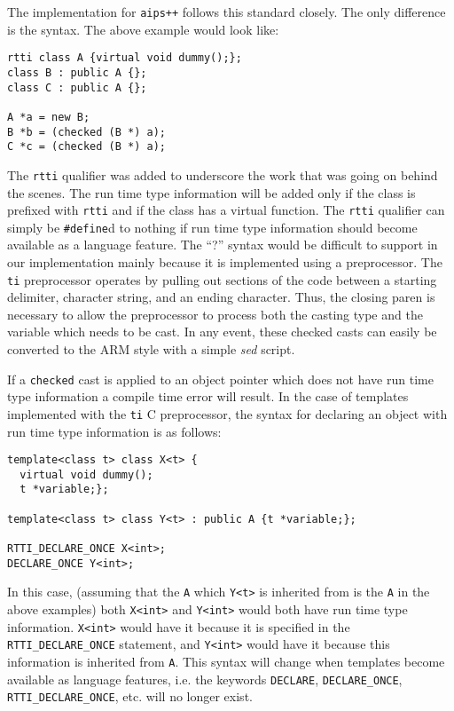 The implementation for {\tt aips++} follows this standard closely. The only
difference is the syntax. The above example would look like:
\begin{verbatim}
rtti class A {virtual void dummy();};
class B : public A {};
class C : public A {};

A *a = new B;
B *b = (checked (B *) a);
C *c = (checked (B *) a);
\end{verbatim}
\noindent
The {\tt rtti} qualifier was added to underscore the work that was going on 
behind the scenes. The run time type information will be added only if the
class is prefixed with {\tt rtti} and if the class has a virtual function.
The {\tt rtti} qualifier can simply be {\tt \#define}d to nothing if 
run time type information should become available as a language feature.
The ``?'' syntax would be difficult to support in our implementation mainly
because it is implemented using a preprocessor. The {\tt ti} preprocessor
operates by pulling out sections of the code between a starting delimiter, 
character string, and an ending character. Thus, the closing paren is 
necessary to allow the preprocessor to process both the casting type and the 
variable which needs to be cast. In any event, these checked casts can easily 
be converted to the ARM style with a simple {\em sed} script.

If a {\tt checked} cast is applied to an object pointer which does not have 
run time type information a compile time error will result. In the case of 
templates implemented with the {\tt ti} C preprocessor, the syntax for declaring
an object with run time type information is as follows:
\begin{verbatim}
template<class t> class X<t> {
  virtual void dummy();
  t *variable;};

template<class t> class Y<t> : public A {t *variable;};

RTTI_DECLARE_ONCE X<int>;
DECLARE_ONCE Y<int>;
\end{verbatim}
\noindent
In this case, (assuming that the {\tt A} which {\tt Y<t>} is inherited from
is the {\tt A} in the above examples) both {\tt X<int>} and {\tt Y<int>}
would both have run time type information. {\tt X<int>} would have it because
it is specified in the {\tt RTTI\_DECLARE\_ONCE} statement, and {\tt Y<int>} 
would have it because this information is inherited from {\tt A}. This syntax
will change when templates become available as language features, i.e. the
keywords {\tt DECLARE}, {\tt DECLARE\_ONCE}, {\tt RTTI\_DECLARE\_ONCE}, etc.
will no longer exist.

